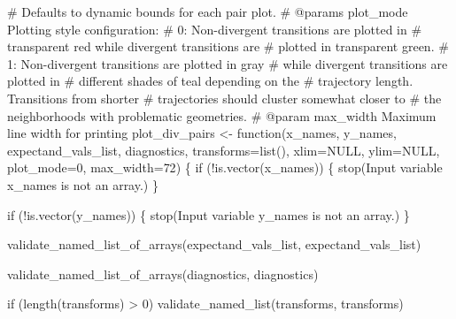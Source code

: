 \documentclass[
  letterpaper,
  DIV=11,
  numbers=noendperiod]{scrartcl}
\newenvironment{Shaded}{\begin{snugshade}}{\end{snugshade}}
\newcommand{\BuiltInTok}[1]{\textcolor[rgb]{0.00,0.23,0.31}{#1}}
\newcommand{\CommentTok}[1]{\textcolor[rgb]{0.37,0.37,0.37}{#1}}
\newcommand{\ControlFlowTok}[1]{\textcolor[rgb]{0.00,0.23,0.31}{#1}}
\newcommand{\DecValTok}[1]{\textcolor[rgb]{0.68,0.00,0.00}{#1}}
\newcommand{\KeywordTok}[1]{\textcolor[rgb]{0.00,0.23,0.31}{#1}}
\newcommand{\NormalTok}[1]{\textcolor[rgb]{0.00,0.23,0.31}{#1}}
\newcommand{\OperatorTok}[1]{\textcolor[rgb]{0.37,0.37,0.37}{#1}}
\newcommand{\StringTok}[1]{\textcolor[rgb]{0.13,0.47,0.30}{#1}}
\begin{document}
\begin{Shaded}
\begin{Highlighting}[]
\CommentTok{\#                   Defaults to dynamic bounds for each pair plot.}
\CommentTok{\# @params plot\_mode Plotting style configuration: }
\CommentTok{\#                     0: Non{-}divergent transitions are plotted in }
\CommentTok{\#                        transparent red while divergent transitions are}
\CommentTok{\#                        plotted in transparent green.}
\CommentTok{\#                     1: Non{-}divergent transitions are plotted in gray }
\CommentTok{\#                        while divergent transitions are plotted in }
\CommentTok{\#                        different shades of teal depending on the }
\CommentTok{\#                        trajectory length.  Transitions from shorter}
\CommentTok{\#                        trajectories should cluster somewhat closer to }
\CommentTok{\#                        the neighborhoods with problematic geometries.}
\CommentTok{\# @param max\_width Maximum line width for printing}
\NormalTok{plot\_div\_pairs }\OperatorTok{\textless{}{-}}\NormalTok{ function(x\_names, y\_names, }
\NormalTok{                           expectand\_vals\_list, diagnostics,}
\NormalTok{                           transforms}\OperatorTok{=}\BuiltInTok{list}\NormalTok{(), xlim}\OperatorTok{=}\NormalTok{NULL, ylim}\OperatorTok{=}\NormalTok{NULL,}
\NormalTok{                           plot\_mode}\OperatorTok{=}\DecValTok{0}\NormalTok{, max\_width}\OperatorTok{=}\DecValTok{72}\NormalTok{) \{}
  \ControlFlowTok{if}\NormalTok{ (}\OperatorTok{!}\KeywordTok{is}\NormalTok{.vector(x\_names)) \{}
\NormalTok{    stop(}\StringTok{\textquotesingle{}Input variable \textasciigrave{}x\_names\textasciigrave{} is not an array.\textquotesingle{}}\NormalTok{)}
\NormalTok{  \}}
  
  \ControlFlowTok{if}\NormalTok{ (}\OperatorTok{!}\KeywordTok{is}\NormalTok{.vector(y\_names)) \{}
\NormalTok{    stop(}\StringTok{\textquotesingle{}Input variable \textasciigrave{}y\_names\textasciigrave{} is not an array.\textquotesingle{}}\NormalTok{)}
\NormalTok{  \}}
  
\NormalTok{  validate\_named\_list\_of\_arrays(expectand\_vals\_list,}
                                \StringTok{\textquotesingle{}expectand\_vals\_list\textquotesingle{}}\NormalTok{)}

\NormalTok{  validate\_named\_list\_of\_arrays(diagnostics, }\StringTok{\textquotesingle{}diagnostics\textquotesingle{}}\NormalTok{)}

  \ControlFlowTok{if}\NormalTok{ (length(transforms) }\OperatorTok{\textgreater{}} \DecValTok{0}\NormalTok{)}
\NormalTok{    validate\_named\_list(transforms, }\StringTok{\textquotesingle{}transforms\textquotesingle{}}\NormalTok{)}
  

\end{Highlighting}
\end{Shaded}
\end{document}
